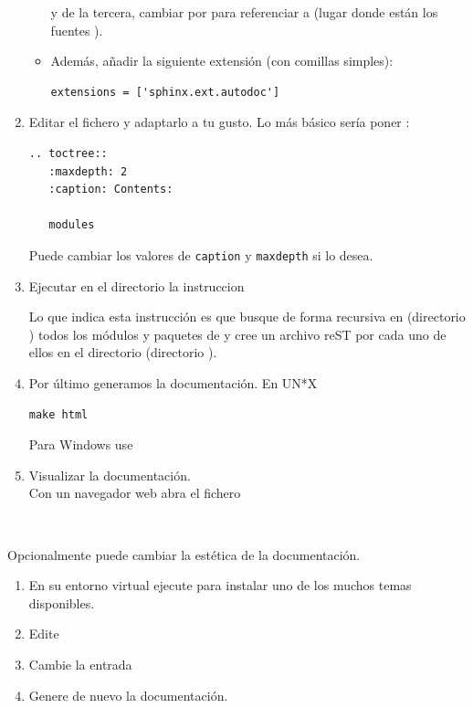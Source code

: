 \begin{enumerate}[nosep]
\begin{itemize}
y de la tercera, cambiar  por  para referenciar a  (lugar donde están los fuentes ).

\item Además, añadir la siguiente extensión (con comillas simples):
\begin{Verbatim}
extensions = ['sphinx.ext.autodoc']
\end{Verbatim}
\end{itemize}


\item Editar el fichero  y adaptarlo a tu gusto. Lo más básico sería poner :
\begin{Verbatim}
.. toctree::
   :maxdepth: 2
   :caption: Contents:

   modules
\end{Verbatim}

Puede cambiar los valores de \texttt{caption} y \texttt{maxdepth} si lo desea.

\item Ejecutar en el directorio  la instruccion 

Lo que indica esta instrucción es que busque de forma recursiva en  (directorio ) todos los módulos y paquetes de  y cree un archivo reST por cada uno de ellos en el directorio  (directorio  ).

\item Por último generamos la documentación. En UN*X
\begin{Verbatim}
make html
\end{Verbatim}
Para Windows use 


\item Visualizar la documentación. \\
Con un navegador web abra el fichero 
\end{enumerate}

\

Opcionalmente puede cambiar la estética de la documentación. 

\begin{enumerate}[nosep]
\item En su entorno virtual ejecute  para instalar uno de los muchos temas disponibles.
\item Edite 
\item Cambie la entrada 
\item Genere de nuevo la documentación.
\end{enumerate}

